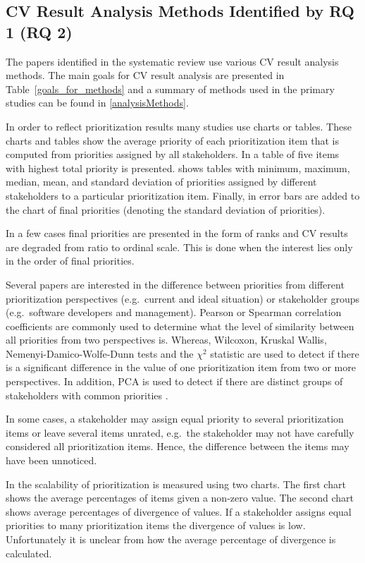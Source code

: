 
\subsection{\label{rq2}CV Result Analysis Methods Identified by RQ 1 (RQ 2)}

The papers identified in the systematic review use various CV result analysis
methods. 
The main goals for CV result analysis are presented in Table~\ref{goals_for_methods} and a summary of methods used in the primary studies can be found in \ref{analysisMethods}.

In order to reflect prioritization results many studies use charts or
tables. These charts and tables show the average priority of each prioritization item that is computed from priorities assigned by all stakeholders.
In \citep{Jonsson2005a} a table of five items with highest total priority is presented. 
\citep{Kuzniarz2010} shows tables with minimum, maximum, median, mean, and standard deviation of priorities assigned by different stakeholders to a particular prioritization item. Finally, in \citep{Rovegard2008,Kuzniarz2010} error bars are added to the chart of final priorities (denoting the standard deviation of priorities).

In a few cases final priorities are presented in the form of ranks and CV results are degraded from ratio to ordinal scale. This is done when the interest lies only in the order of final priorities.

Several papers are interested in the difference between priorities from
different prioritization perspectives (e.g.\ current and ideal situation)
or stakeholder groups (e.g.\ software developers and management). Pearson
or Spearman correlation coefficients are commonly used to determine what 
the level of similarity between all priorities from two perspectives is.
Whereas, Wilcoxon, Kruskal Wallis, Nemenyi-Damico-Wolfe-Dunn tests and the $\chi^2$ statistic are used to detect if there is a significant
difference in the value of one prioritization item from two or more perspectives. In addition, PCA is used to detect if there are distinct groups of stakeholders with common priorities \citep{Chatzipetrou2010,Pettersson2008,Wohlin2006}.

In some cases, a stakeholder may assign equal priority to several prioritization items or leave several items unrated, e.g.\ the stakeholder may not have carefully considered all prioritization items. Hence, the difference between the items may have been unnoticed.

In \citep{Berander2006a} the scalability of prioritization is measured
using two charts. The first chart shows the average percentages of items given a non-zero value. The second chart shows average percentages of divergence of values. If a stakeholder assigns equal priorities to many prioritization items the divergence of values is low. Unfortunately it is unclear from \citep{Berander2006a} how the average percentage of divergence is calculated.

